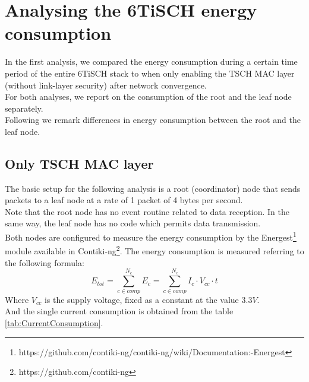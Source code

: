 \documentclass[conference]{IEEEtran}
\begin{document}
\section{Analysing the 6TiSCH energy consumption}
\label{section:task1}
In the first analysis, we compared the energy consumption during a certain time period of the entire 6TiSCH stack to when only enabling the TSCH MAC layer (without link-layer security) after network convergence.\\
For both analyses, we report on the consumption of the root and the leaf node separately.\\
Following we remark differences in energy consumption between the root and the leaf node.

\subsection{Only TSCH MAC layer}
The basic setup for the following analysis is a root (coordinator) node that sends packets to a leaf node at a rate of 1 packet of 4 bytes per second.\\
Note that the root node has no event routine related to data reception. In the same way, the leaf node has no code which permits data transmission.\\
Both nodes are configured to measure the energy consumption by the Energest\footnote{https://github.com/contiki-ng/contiki-ng/wiki/Documentation:-Energest} module available in Contiki-ng\footnote{https://github.com/contiki-ng}.
The energy consumption is measured referring to the following formula:
\begin{equation}
	E_{tot}=\sum_{c \in comp}^{N_{c}}E_{c}=\sum_{c \in comp}^{N_{c}}I_c  \cdot V_{cc} \cdot t
\end{equation}
Where $V_{cc}$ is the supply voltage, fixed as a constant at the value $3.3V$.\\
And the single current consumption is obtained from the table \ref{tab:CurrentConsumption}\cite{EnergyConsumption}.\\
\end{document}
